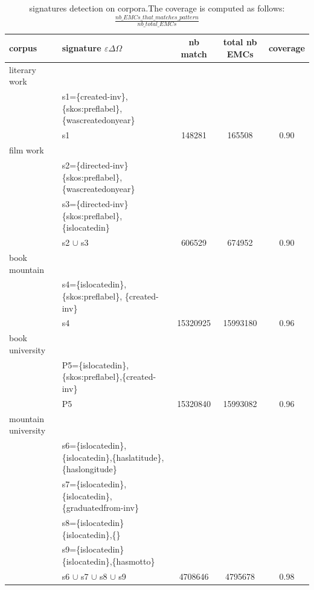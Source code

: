 \documentclass[runningheads]{llncs}
\begin{document}
\begin{table}[]
    \centering
    \begin{tabular}{l|l|c|c|c}
        \hline
         corpus & signature $\varepsilon\Delta\Omega$ & nb match & total nb EMCs & coverage   \\
         \hline
       literary work  & & & & \\
         & s1=\{created-inv\},\{skos:preflabel\},\{wascreatedonyear\}& & & \\
       \hline  
       & s1 & 148281 & 165508 & 0.90\\
       \hline
       film work & & & & \\  
       & s2=\{directed-inv\}\{skos:preflabel\},\{wascreatedonyear\} & & & \\
       & s3=\{directed-inv\}\{skos:preflabel\},\{islocatedin\} & & & \\
       \hline
        & s2 $\cup$ s3 & 606529 & 674952 & 0.90\\
       \hline
       \hline
       book mountain & & & & \\  
       & s4=\{islocatedin\},\{skos:preflabel\}, \{created-inv\}& & & \\
       \hline
       & s4 & 15320925 & 15993180 & 0.96\\
       \hline
       book university & & & &  \\
       & P5=\{islocatedin\},\{skos:preflabel\},\{created-inv\}& & & \\
       \hline
       & P5 & 15320840 & 15993082 & 0.96 \\
       \hline
       mountain university  & & & & \\
       & s6=\{islocatedin\},\{islocatedin\},\{haslatitude\}, \{haslongitude\}& & & \\
       &s7=\{islocatedin\},\{islocatedin\},\{graduatedfrom-inv\}& & & \\
       &s8=\{islocatedin\}\{islocatedin\},\{\}& & & \\
       &s9=\{islocatedin\}\{islocatedin\},\{hasmotto\}& & & \\
       \hline
       &s6 $\cup$ s7 $\cup$ s8 $\cup$ s9 & 4708646 & 4795678& 0.98\\
       \hline
    \end{tabular}
    \caption{signatures detection on corpora.The coverage is computed as follows: $\frac{nb\_EMCs\_that\_matches\_pattern}{nb\_total\_ EMCs}$}
    \label{tab:signature_detection}
\end{table}
\end{document}
